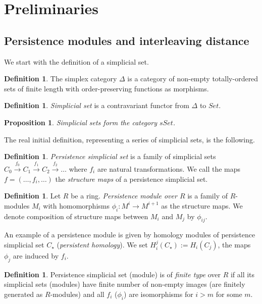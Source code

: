 \documentclass[english,12pt]{article}
\newcounter{stmcounter}[section]
\numberwithin{equation}{section}
\newtheorem{proposition}[stmcounter]{Proposition}
\theoremstyle{definition}
\newtheorem{definition}[stmcounter]{Definition}
\theoremstyle{remark}
\newcommand{\define}[1]{{\textit{#1}}}
\begin{document}
\section{Preliminaries}

\subsection{Persistence modules and interleaving distance}

We start with the definition of a simplicial set.

\begin{definition}
  The simplex category $\Delta$ is a category of non-empty totally-ordered sets of finite length with order-preserving functions as morphisms.
\end{definition}

\begin{definition}
  \define{Simplicial set} is a contravariant functor from $\Delta$ to $Set$.
\end{definition}

\begin{proposition}
  Simplicial sets form the category $sSet$.
\end{proposition}

The real initial definition, representing a series of simplicial sets, is the following.

\begin{definition}
  \define{Persistence simplicial set} is a family of simplicial sets $C_{0} \xrightarrow{f_0} C_{1} \xrightarrow{f_1} C_{2} \xrightarrow{f_2} \ldots$ where $f_i$ are natural transformations. We call the maps $f=(\ldots,f_i,\ldots)$ the \define{structure maps} of a persistence simplicial set.
\end{definition}

\begin{definition}
  Let $R$ be a ring. \define{Persistence module over $R$} is a family of $R$-modules $M_i$ with homomorphisms $\phi_i : M^i \to M^{i+1}$ as the structure maps. We denote composition of structure maps between $M_i$ and $M_j$ by $\phi_{ij}$.
\end{definition}

An example of a persistence module is given by homology modules of persistence simplicial set $C_{\star}$ (\define{persistent homology}). We set $H_i^j(C_{\star}) := H_i(C_{j})$, the maps $\phi_j$ are induced by $f_i$.\\

\begin{definition}
  Persistence simplicial set (module) is of \define{finite type} over $R$ if all its simplicial sets (modules) have finite number of non-empty images (are finitely generated as $R$-modules) and all $f_i$ ($\phi_i$) are isomorphisms for $i > m$ for some $m$.
\end{definition}
\end{document}
